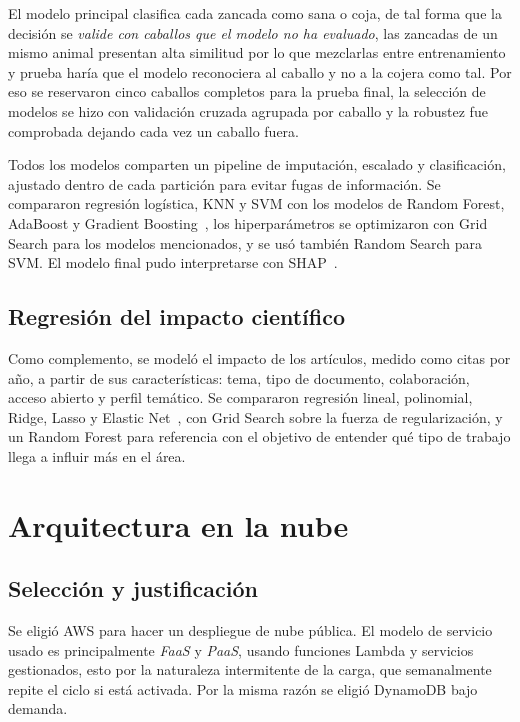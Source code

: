 \documentclass[conference,a4paper]{IEEEtran}
\begin{document}
El modelo principal clasifica cada zancada como sana o coja, de tal forma que la decisión se \emph{valide con caballos que el modelo no ha evaluado}, las zancadas de un mismo animal presentan alta similitud por lo que mezclarlas entre entrenamiento y prueba haría que el modelo reconociera al caballo y no a la cojera como tal. Por eso se reservaron cinco caballos completos para la prueba final, la selección de modelos se hizo con validación cruzada agrupada por caballo y la robustez fue comprobada dejando cada vez un caballo fuera.

Todos los modelos comparten un pipeline de imputación, escalado y clasificación, ajustado dentro de cada partición para evitar fugas de información. Se compararon regresión logística, KNN y SVM con los modelos de Random Forest, AdaBoost y Gradient Boosting~\cite{breiman2001}, los hiperparámetros se optimizaron con Grid Search para los modelos mencionados, y se usó también Random Search para SVM. El modelo final pudo interpretarse con SHAP~\cite{lundberg2017}.

\subsection{Regresión del impacto científico}

Como complemento, se modeló el impacto de los artículos, medido como citas por año, a partir de sus características: tema, tipo de documento, colaboración, acceso abierto y perfil temático. Se compararon regresión lineal, polinomial, Ridge, Lasso y Elastic Net~\cite{tibshirani1996,zou2005}, con Grid Search sobre la fuerza de regularización, y un Random Forest para referencia con el objetivo de entender qué tipo de trabajo llega a influir más en el área.

\section{Arquitectura en la nube}

\subsection{Selección y justificación}

Se eligió AWS para hacer un despliegue de nube pública. El modelo de servicio usado es principalmente \emph{FaaS} y \emph{PaaS}, usando funciones Lambda y servicios gestionados, esto por la naturaleza intermitente de la carga, que semanalmente repite el ciclo si está activada. Por la misma razón se eligió DynamoDB bajo demanda.
\end{document}
